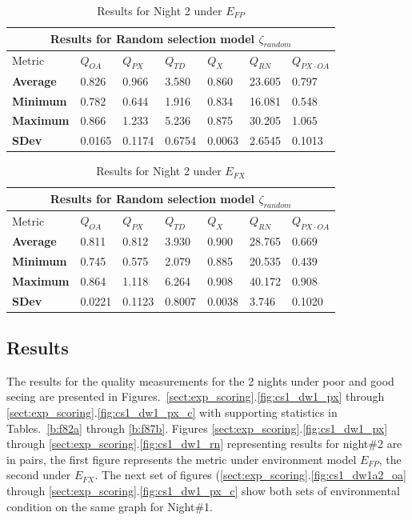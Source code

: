 \begin{table}
\begin{center}
\begin{tabular}{lllllll}
\toprule
\multicolumn{7}{c}{Results for Random selection model $\zeta_{random}$} \\
\midrule
Metric & $Q_{OA}$ & $Q_{PX}$ & $Q_{TD}$ & $Q_{X}$ & $Q_{RN}$ & $Q_{PX \cdot OA}$ \\
\midrule
{\bf Average} & 0.826  & 0.966  & 3.580  & 0.860  & 23.605 & 0.797\\
{\bf Minimum} & 0.782  & 0.644  & 1.916  & 0.834  & 16.081 & 0.548\\
{\bf Maximum} & 0.866  & 1.233  & 5.236  & 0.875  & 30.205 & 1.065\\
{\bf SDev}    & 0.0165 & 0.1174 & 0.6754 & 0.0063 & 2.6545 & 0.1013\\
\bottomrule
\end{tabular}
\end{center}
\caption{Results for Night 2 under $E_{FP}$}
\label{tab:rand_2fp}
\end{table}

\begin{table}
\begin{center}
\begin{tabular}{lllllll}
\toprule
\multicolumn{7}{c}{Results for Random selection model $\zeta_{random}$} \\
\midrule
Metric & $Q_{OA}$ & $Q_{PX}$ & $Q_{TD}$ & $Q_{X}$ & $Q_{RN}$ & $Q_{PX \cdot OA}$ \\
\midrule
{\bf Average} & 0.811  & 0.812  & 3.930  & 0.900  & 28.765 & 0.669\\
{\bf Minimum} & 0.745  & 0.575  & 2.079  & 0.885  & 20.535 & 0.439\\
{\bf Maximum} & 0.864  & 1.118  & 6.264  & 0.908  & 40.172 & 0.908\\
{\bf SDev}    & 0.0221 & 0.1123 & 0.8007 & 0.0038 & 3.746 & 0.1020\\
\bottomrule
\end{tabular}
\end{center}
\caption{Results for Night 2 under $E_{FX}$}
\label{tab:rand_2fx}
\end{table}


\subsection{Results}
The results for the quality measurements for the 2 nights under poor and good seeing are presented in Figures.~\ref{sect:exp_scoring}.\ref{fig:cs1_dw1_px} through \ref{sect:exp_scoring}.\ref{fig:cs1_dw1_px_c} with supporting statistics in Tables.~\ref{b:f82a} through \ref{b:f87b}. Figures \ref{sect:exp_scoring}.\ref{fig:cs1_dw1_px} through \ref{sect:exp_scoring}.\ref{fig:cs1_dw1_rn} representing results for night\#2 are in pairs, the first figure represents the metric under environment model $E_{FP}$, the second under $E_{FX}$. The next set of figures (\ref{sect:exp_scoring}.\ref{fig:cs1_dw1a2_oa} through \ref{sect:exp_scoring}.\ref{fig:cs1_dw1_px_c} show both sets of environmental condition on the same graph for Night\#1.



